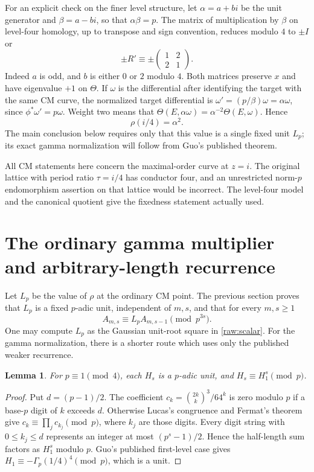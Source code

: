 \documentclass[11pt,a4paper]{article}
\newtheorem{lemma}[theorem]{Lemma}
\begin{document}
For an explicit check on the finer level structure, let
$\alpha=a+bi$ be the unit generator and $\beta=a-bi$, so that
$\alpha\beta=p$. The matrix of multiplication by $\beta$ on level-four
homology, up to transpose and sign convention, reduces modulo $4$ to
$\pm I$ or
\[
 \pm R'\equiv\pm\begin{pmatrix}1&2\\2&1\end{pmatrix}.
\]
Indeed $a$ is odd, and $b$ is either $0$ or $2$ modulo $4$. Both matrices
preserve $x$ and have eigenvalue $+1$ on $\Theta$.
If $\omega$ is the differential after identifying the target with the
same CM curve, the normalized target differential is
$\omega'=(p/\beta)\omega=\alpha\omega$, since
$\phi^*\omega'=p\omega$. Weight two means that
$\Theta(E,\alpha\omega)=\alpha^{-2}\Theta(E,\omega)$. Hence
\begin{equation}\label{raw:scalar}
 \rho(i/4)=\alpha^2.
\end{equation}
The main conclusion below requires only that this value is a single
fixed unit $L_p$; its exact gamma normalization will follow from Guo's
published theorem.

All CM statements here concern the maximal-order curve at $z=i$.
The original lattice with period ratio $\tau=i/4$ has conductor four,
and an unrestricted norm-$p$ endomorphism assertion on that lattice
would be incorrect. The level-four model and the canonical quotient
give the fixedness statement actually used.


\section{The ordinary gamma multiplier and arbitrary-length recurrence}\label{sec:gamma}

Let $L_p$ be the value of $\rho$ at the ordinary CM point. The previous
section proves that $L_p$ is a fixed $p$-adic unit, independent of $m,s$,
and that for every $m,s\ge1$
\begin{equation}\label{eq:geometric}
 A_{m,s}\equiv L_pA_{m,s-1}\pmod{p^{3s}}.
\end{equation}
One may compute $L_p$ as the Gaussian unit-root square in
\eqref{raw:scalar}. For the gamma normalization, there is a shorter route
which uses only the published weaker recurrence.

\begin{lemma}\label{lem:units}
For $p\equiv1\pmod4$, each $H_s$ is a $p$-adic unit, and
$H_s\equiv H_1^s\pmod p$.
\end{lemma}
\begin{proof}
Put $d=(p-1)/2$. The coefficient
$c_k=\binom{2k}{k}^3/64^k$ is zero modulo $p$ if a base-$p$ digit of
$k$ exceeds $d$. Otherwise Lucas's congruence and Fermat's theorem give
$c_k\equiv\prod_j c_{k_j}\pmod p$, where $k_j$ are those digits.
Every digit string with $0\le k_j\le d$ represents an integer at most
$(p^s-1)/2$. Hence the half-length sum factors as $H_1^s$ modulo $p$.
Guo's published first-level case gives
$H_1\equiv-\Gamma_p(1/4)^4\pmod p$, which is a unit.
\end{proof}
\end{document}
